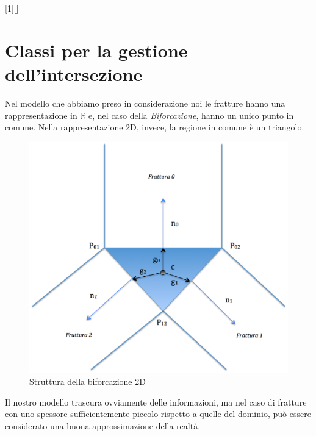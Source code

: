 [1][]{}{}

\chapter{Classi per la gestione dell'intersezione}

Nel modello che abbiamo preso in considerazione noi le fratture hanno una rappresentazione in $\mathbb{R}$ e, nel caso della \textit{Biforcazione}, hanno un unico punto in comune. 
Nella rappresentazione 2D, invece, la regione in comune è un triangolo. \\

\begin{figure}[htbp]
\centering
\includegraphics[scale=.5]{img/TriangoloBiforcazione.eps}
\caption{Struttura della biforcazione 2D}\label{Biforcazione}
\end{figure}

Il nostro modello trascura ovviamente delle informazioni, ma nel caso di fratture con uno spessore sufficientemente piccolo rispetto a quelle del dominio, può essere considerato una buona approssimazione della realtà.\\

